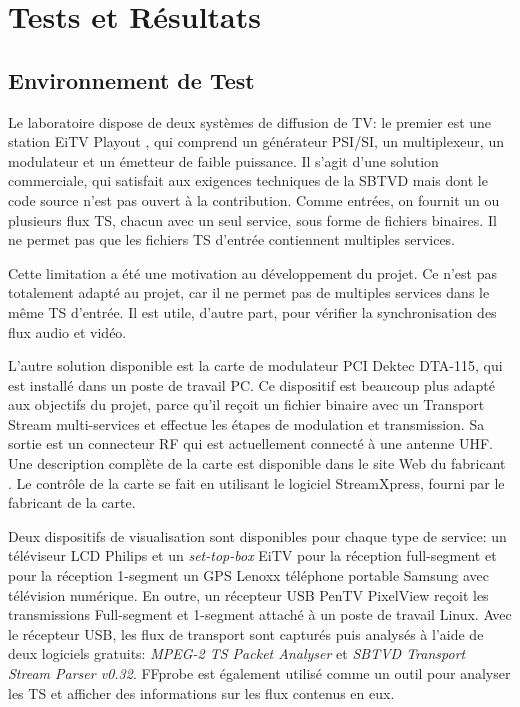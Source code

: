 \documentclass[12pt,a4paper]{article}
\begin{document}
\section{Tests et Résultats}

\subsection{Environnement de Test}

Le laboratoire dispose de deux systèmes de diffusion de TV: le premier est une station EiTV Playout \cite{eitv}, qui comprend un générateur PSI/SI, un multiplexeur, un modulateur et un émetteur de faible puissance. Il s'agit d'une solution commerciale, qui satisfait aux exigences techniques de la SBTVD mais dont le code source n'est pas ouvert à la contribution. Comme entrées, on fournit un ou plusieurs flux TS, chacun avec un seul service, sous forme de fichiers binaires. Il ne permet pas que les fichiers TS d'entrée contiennent multiples services.

Cette limitation a été une motivation au développement du projet. Ce n'est pas totalement adapté au projet, car il ne permet pas de multiples services dans le même TS d'entrée. Il est utile, d'autre part, pour vérifier la synchronisation des flux audio et vidéo.

L'autre solution disponible est la carte de modulateur PCI Dektec DTA-115, qui est installé dans un poste de travail PC. Ce dispositif est beaucoup plus adapté aux objectifs du projet, parce qu'il reçoit un fichier binaire avec un Transport Stream multi-services et effectue les étapes de modulation et transmission. Sa sortie est un connecteur RF qui est actuellement connecté à une antenne UHF. Une description complète de la carte est disponible dans le site Web du fabricant \cite{dektec}. Le contrôle de la carte se fait en utilisant le logiciel StreamXpress, fourni par le fabricant de la carte.

Deux dispositifs de visualisation sont disponibles pour chaque type de service: un téléviseur LCD Philips et un \textit{set-top-box} EiTV pour la réception full-segment et pour la réception 1-segment un GPS Lenoxx téléphone portable Samsung avec télévision numérique. En outre, un récepteur USB PenTV PixelView reçoit les transmissions Full-segment et 1-segment attaché à un poste de travail Linux. Avec le récepteur USB, les flux de transport sont capturés puis analysés à l'aide de deux logiciels gratuits: \textit{MPEG-2 TS Packet Analyser} et \textit{SBTVD Transport Stream Parser v0.32}. FFprobe est également utilisé comme un outil pour analyser les TS et afficher des informations sur les flux contenus en eux.
\end{document}
